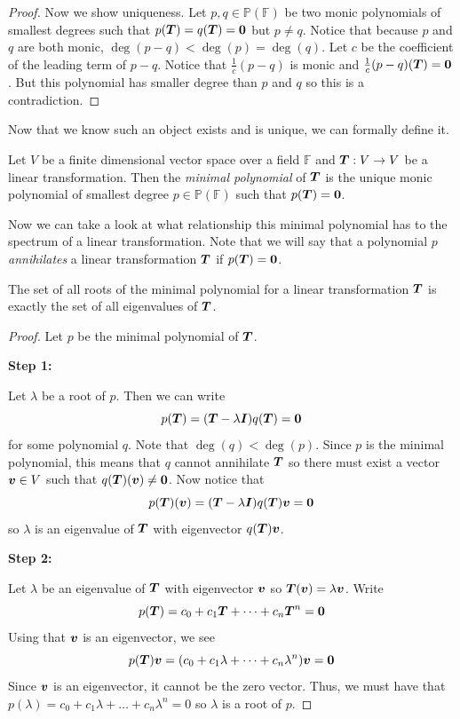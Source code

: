 \begin{proof}
    Now we show uniqueness. Let $p,q\in\mathbb{P}(\mathbb{F})$ be two monic polynomials of smallest degrees such that $p(\boldsymbol{T})=q(\boldsymbol{T})=\boldsymbol{0}$ but $p\neq q$. Notice that because $p$ and $q$ are both monic, $\deg(p-q)<\deg(p)=\deg(q)$. Let $c$ be the coefficient of the leading term of $p-q$. Notice that $\frac{1}{c}(p-q)$ is monic and $\frac{1}{c}(p-q)(\boldsymbol{T})=\boldsymbol{0}$. But this polynomial has smaller degree than $p$ and $q$ so this is a contradiction.
    \end{proof}

    Now that we know such an object exists and is unique, we can formally define it.
    \begin{definition}
        Let $V$ be a finite dimensional vector space over a field $\mathbb{F}$ and $\boldsymbol{T}:V\to V$ be a linear transformation. Then the \textit{minimal polynomial} of $\boldsymbol{T}$ is the unique monic polynomial of smallest degree $p\in\mathbb{P}(\mathbb{F})$ such that $p(\boldsymbol{T})=\boldsymbol{0}$.
    \end{definition}

Now we can take a look at what relationship this minimal polynomial has to the spectrum of a linear transformation. Note that we will say that a polynomial $p$ \textit{annihilates} a linear transformation $\boldsymbol{T}$ if $p(\boldsymbol{T})=\boldsymbol{0}$.

\begin{theorem}
    The set of all roots of the minimal polynomial for a linear transformation $\boldsymbol{T}$ is exactly the set of all eigenvalues of $\boldsymbol{T}$.
\end{theorem}

\begin{proof}
    Let $p$ be the minimal polynomial of $\boldsymbol{T}$.

    \textbf{Step 1:}

    Let $\lambda$ be a root of $p$. Then we can write
    \[
    p(\boldsymbol{T})=(\boldsymbol{T}-\lambda \boldsymbol{I})q(\boldsymbol{T})=\boldsymbol{0}
    \]
    for some polynomial $q$. Note that $\deg(q)<\deg(p)$. Since $p$ is the minimal polynomial, this means that $q$ cannot annihilate $\boldsymbol{T}$ so there must exist a vector $\boldsymbol{v}\in V$ such that $q(\boldsymbol{T})(\boldsymbol{v})\neq\boldsymbol{0}$. Now notice that
    \[
    p(\boldsymbol{T})(\boldsymbol{v})=(\boldsymbol{T}-\lambda \boldsymbol{I})q(\boldsymbol{T})\boldsymbol{v}=\boldsymbol{0}
    \]
    so $\lambda$ is an eigenvalue of $\boldsymbol{T}$ with eigenvector $q(\boldsymbol{T})\boldsymbol{v}$.

    \textbf{Step 2:}

    Let $\lambda$ be an eigenvalue of $\boldsymbol{T}$ with eigenvector $\boldsymbol{v}$ so $\boldsymbol{T}(\boldsymbol{v})=\lambda\boldsymbol{v}$. Write
    \[
    p(\boldsymbol{T})=c_0+c_1\boldsymbol{T}+\dots+c_n\boldsymbol{T}^n=\boldsymbol{0}
    \]
    Using that $\boldsymbol{v}$ is an eigenvector, we see
    \[
    p(\boldsymbol{T})\boldsymbol{v}=(c_0+c_1\lambda+\dots+c_n\lambda^n)\boldsymbol{v}=\boldsymbol{0}
    \]
    Since $\boldsymbol{v}$ is an eigenvector, it cannot be the zero vector. Thus, we must have that $p(\lambda)=c_0+c_1\lambda+\dots+c_n\lambda^n=0$ so $\lambda$ is a root of $p$.
\end{proof}

